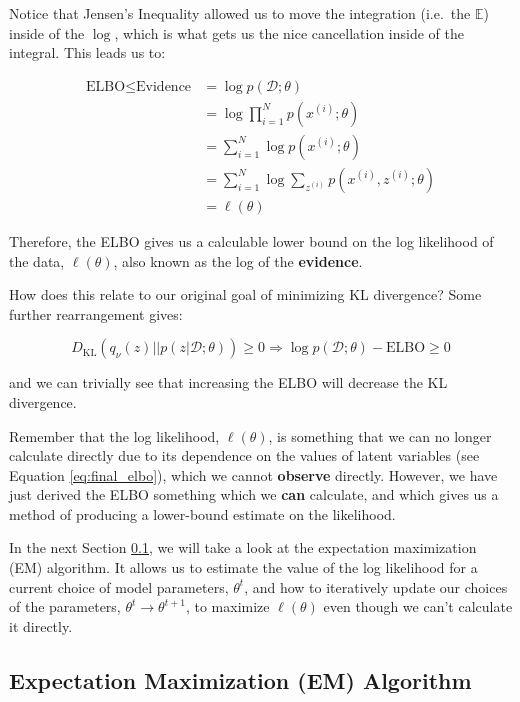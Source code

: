 \documentclass[]{article}
\begin{document}
Notice that Jensen's Inequality allowed us to move the integration (i.e.\ the $\mathbb{E}$) inside of the $\log$, which is what gets us the nice cancellation inside of the integral. This leads us to:

\begin{align}\label{eq:final_elbo}
    \text{ELBO} \leq \text{Evidence} &= \log p(\mathcal{D} ;\theta)\\ 
    &= \log \prod_{i=1}^{N} p(x^{(i)};\theta)
    \\    
    &= \sum_{i=1}^{N}\log p(x^{(i)}; \theta)
    \\
    &= \sum_{i=1}^N \log \sum_{z^{(i)}} p(x^{(i)}, z^{(i)} ;\theta)\\
    &= \ell(\theta)
\end{align}

Therefore, the ELBO gives us a calculable lower bound on the log likelihood of the data, $\ell(\theta)$, also known as the log of the \textbf{evidence}. 

How does this relate to our original goal of minimizing KL divergence? Some further rearrangement gives:

\begin{equation}
    D_\text{KL}(q_\nu(z)||p(z | \mathcal{D};\theta)) \geq 0 \Rightarrow \log p (\mathcal{D} ;\theta) - \text{ELBO} \geq 0
\end{equation}

and we can trivially see that increasing the ELBO will decrease the KL divergence. 

Remember that the log likelihood, $\ell(\theta)$, is something that we can no longer calculate directly due to its dependence on the values of latent variables (see Equation \ref{eq:final_elbo}), which we cannot \textbf{observe} directly. However, we have just derived the ELBO something which we \textbf{can} calculate, and which gives us a method of producing a lower-bound estimate on the likelihood. 

In the next Section \ref{section:expectation_maximization}, we will take a look at the expectation maximization (EM) algorithm. It allows us to estimate the value of the log likelihood for a current choice of model parameters, $\theta^t$, and how to iteratively update our choices of the parameters, $\theta^{t}\rightarrow \theta^{t+1}$, to maximize $\ell(\theta)$ even though we can't calculate it directly.

\subsection{Expectation Maximization (EM) Algorithm}\label{section:expectation_maximization}
\end{document}

